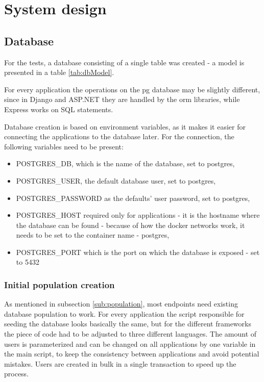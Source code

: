 
\chapter{System design}

\section{Database}\label{sec:pgDbVars}

For the tests, a database consisting of a single table was created - a model is presented in a table \ref{tab:dbModel}.



For every application the operations on the \acrlong{pg} database may be slightly different, since in Django and ASP.NET they are handled by the \acrlong{orm} libraries, while Express works on SQL statements.

Database creation is based on environment variables, as it makes it easier for connecting the applications to the database later. For the connection, the following variables need to be present:
\begin{itemize}
  \item POSTGRES\_DB, which is the name of the database, set to postgres,
  \item POSTGRES\_USER, the default database user, set to postgres,
  \item POSTGRES\_PASSWORD as the defaults' user password, set to postgres,
  \item POSTGRES\_HOST required only for applications - it is the hostname where the database can be found - because of how the docker networks work, it needs to be set to the container name - postgres,
  \item POSTGRES\_PORT which is the port on which the database is exposed - set to 5432
\end{itemize}

\subsection{Initial population creation}

As mentioned in subsection \ref{sub:population}, most endpoints need existing database population to work. For every application the script responsible for seeding the database looks basically the same, but for the different frameworks the piece of code had to be adjusted to three different languages. The amount of users is parameterized and can be changed on all applications by one variable in the main script, to keep the consistency between applications and avoid potential mistakes. Users are created in bulk in a single transaction to speed up the process.

